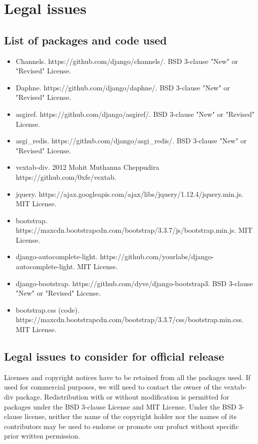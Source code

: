 \documentclass[a4paper]{article}
\begin{document}
\section{Legal issues}

\subsection{List of packages and code used}

\begin{itemize}
\item Channels. https://github.com/django/channels/. BSD 3-clause "New" or "Revised" License.
\item Daphne. https://github.com/django/daphne/. BSD 3-clause "New" or "Revised" License.
\item asgiref. https://github.com/django/asgiref/. BSD 3-clause "New" or "Revised" License.
\item asgi\_redis. https://github.com/django/asgi\_redis/. BSD 3-clause "New" or "Revised" License.
\item vextab-div. 2012 Mohit Muthanna Cheppudira https://github.com/0xfe/vextab.
\item jquery. https://ajax.googleapis.com/ajax/libs/jquery/1.12.4/jquery.min.js. MIT License.
\item bootstrap. https://maxcdn.bootstrapcdn.com/bootstrap/3.3.7/js/bootstrap.min.js. MIT License.
\item django-autocomplete-light. https://github.com/yourlabs/django-autocomplete-light. MIT License.
\item django-bootstrap. https://github.com/dyve/django-bootstrap3. BSD 3-clause "New" or "Revised" License.
\item bootstrap.css (code). \\
https://maxcdn.bootstrapcdn.com/bootstrap/3.3.7/css/bootstrap.min.css. MIT License.
\end{itemize}

\subsection{Legal issues to consider for official release}

Licenses and copyright notices have to be retained from all the packages used. If used for commercial purposes, we will need to contact the owner of the vextab-div package. Redistribution with or without modification is permitted for packages under the BSD 3-clause License and MIT License. Under the BSD 3-clause license, neither the name of the copyright holder nor the names of its contributors may be used to endorse or promote our profuct without specific prior written permission.
\end{document}
